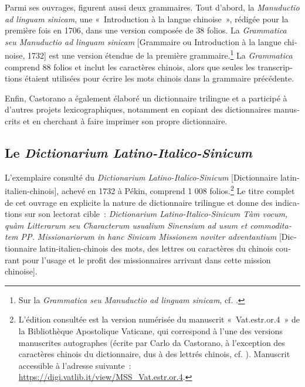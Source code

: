 \documentclass[output=paper,colorlinks,citecolor=brown,arabicfont,chinesefont,booklanguage=french]{langscibook}
\begin{document}
\begin{otherlanguage}{french}
Parmi ses ouvrages, figurent aussi deux grammaires. Tout d’abord, la \emph{Manuductio ad linguam sinicam}, une «~Introduction à la langue chinoise~», rédigée pour la première fois en 1706, dans une version composée de 38 folios. La \emph{Grammatica seu Manuductio ad linguam sinicam} [Grammaire ou Introduction à la langue chinoise, 1732] est une version étendue de la première grammaire.\footnote{Sur la \emph{Grammatica seu Manuductio ad linguam sinicam}, cf. \citet{Li2017}.} La \emph{Grammatica} comprend 88 folios et inclut les caractères chinois, alors que seules les transcriptions étaient utilisées pour écrire les mots chinois dans la grammaire précédente.

Enfin, Castorano a également élaboré un dictionnaire trilingue et a participé à d’autres projets lexicographiques, notamment en copiant des dictionnaires manuscrits et en cherchant à faire imprimer son propre dictionnaire. 

\subsection{Le \emph{Dictionarium Latino-Italico-Sinicum}}

L’exemplaire consulté du \emph{Dictionarium Latino-Italico-Sinicum} [Dictionnaire latin-italien-chinois], achevé en 1732 à Pékin, comprend 1 008 folios.\footnote{L’édition consultée est la version numérisée du manuscrit «~Vat.estr.or.4~» de la Bibliothèque Apostolique Vaticane, qui correspond à l’une des versions manuscrites autographes (écrite par Carlo da Castorano, à l’exception des caractères chinois du dictionnaire, dus à des lettrés chinois, cf. \citealt[180]{Li2017}). Manuscrit accessible à l’adresse suivante~: \url{https://digi.vatlib.it/view/MSS\_Vat.estr.or.4}.} Le titre complet de cet ouvrage en explicite la nature de dictionnaire trilingue et donne des indications sur son lectorat cible~: \emph{Dictionarium Latino-Italico-Sinicum Tàm vocum, quàm Litterarum seu Characterum usualium Sinensium ad usum et commoditatem PP. Missionariorum in hanc Sinicam Missionem noviter adventantium} [Dictionnaire latin-italien-chinois des mots, des lettres ou caractères du chinois courant pour l’usage et le profit des missionnaires arrivant dans cette mission chinoise].


\end{otherlanguage}
\end{document}
